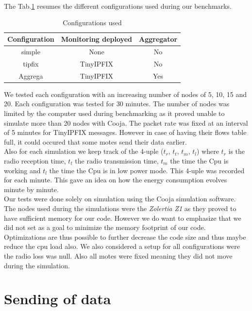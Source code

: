The Tab.\ref{table:configurations} resumes the different configurations used during our benchmarks. \\

\begin{table}
  \centering
  \begin{tabular}{|c|c|c|}
    \hline
    Configuration & Monitoring deployed & Aggregator \\
    \hline
    simple & None & No \\
    \hline
    tipfix & TinyIPFIX & No \\
    \hline
    Aggrega & TinyIPFIX & Yes \\
    \hline
  \end{tabular}
  \caption{Configurations used}
  \label{table:configurations}
\end{table}

We tested each configuration with an increasing number of nodes of 5, 10, 15 and 20. Each configuration was tested for 30 minutes. The number of nodes was limited by the computer used during benchmarking as it proved unable to simulate more than 20 nodes with Cooja. The packet rate was fixed at an interval of 5 minutes for TinyIPFIX messages. However in case of having their flows table full, it could occured that some motes send their data earlier.\\

Also for each simulation we keep track of the 4-uple ($t_r$, $t_t$, $t_m$, $t_l$) where $t_r$ is the radio reception time, $t_t$ the radio transmission time, $t_m$ the time the Cpu is working and $t_l$ the time the Cpu is in low power mode. This 4-uple was recorded for each minute. This gave an idea on how the energy consumption evolves minute by minute.\\

Our tests were done solely on simulation using the Cooja simulation software. The nodes used during the simulations were the \textit{Zolertia Z1} as they proved to have sufficient memory for our code. However we do want to emphasize that we did not set as a goal to minimize the memory footprint of our code. Optimizations are thus possible to further decrease the code size and thus maybe reduce the cpu load also. We also considered a setup for all configurations were the radio loss was null. Also all motes were fixed meaning they did not move during the simulation.

\section{Sending of data}

